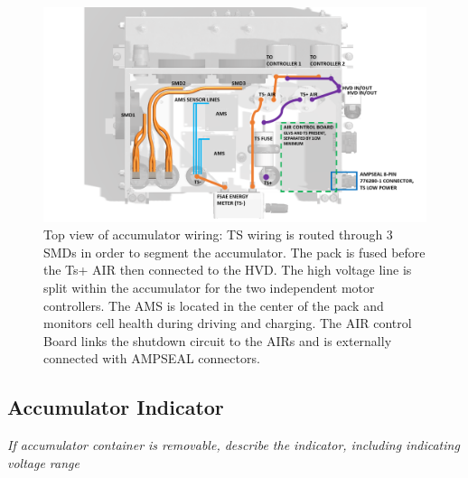 \documentclass{article}
\begin{document}
        \begin{figure}[H]
            \centering
            \includegraphics[width = 0.9 \textwidth]{ACCUMULATOR_WIRING_TOP}
            \caption{Top view of accumulator wiring: TS wiring is routed through 3 SMDs in order to segment the accumulator. The pack is fused before the Ts+ AIR then connected to the HVD. The high voltage line is split within the accumulator for the two independent motor controllers. The AMS is located in the center of the pack and monitors cell health during driving and charging. The AIR control Board links the shutdown circuit to the AIRs and is externally connected with AMPSEAL connectors.}
            \label{ACCUMULATOR_WIRING_SIDE}
        \end{figure}


\subsection{Accumulator Indicator}

    \textit{If accumulator container is removable, describe the indicator, including indicating voltage range}
\end{document}
